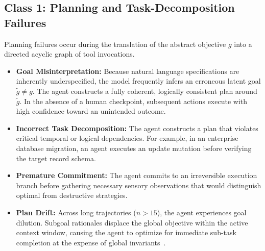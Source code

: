 \documentclass[conference]{IEEEtran}
\begin{document}
\subsection{Class 1: Planning and Task-Decomposition Failures}
Planning failures occur during the translation of the abstract objective $g$ into a directed acyclic graph of tool invocations.
\begin{itemize}
    \item \textbf{Goal Misinterpretation:} Because natural language specifications are inherently underspecified, the model frequently infers an erroneous latent goal $\tilde{g} \ne g$. The agent constructs a fully coherent, logically consistent plan around $\tilde{g}$. In the absence of a human checkpoint, subsequent actions execute with high confidence toward an unintended outcome.
    \item \textbf{Incorrect Task Decomposition:} The agent constructs a plan that violates critical temporal or logical dependencies. For example, in an enterprise database migration, an agent executes an update mutation before verifying the target record schema.
    \item \textbf{Premature Commitment:} The agent commits to an irreversible execution branch before gathering necessary sensory observations that would distinguish optimal from destructive strategies.
    \item \textbf{Plan Drift:} Across long trajectories ($n > 15$), the agent experiences goal dilution. Subgoal rationales displace the global objective within the active context window, causing the agent to optimize for immediate sub-task completion at the expense of global invariants~\cite{liu2024agentbench}.
\end{itemize}
\end{document}
